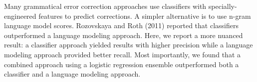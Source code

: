 Many grammatical error correction approaches use classifiers with specially-engineered features to predict corrections. A simpler alternative is to use n-gram language model scores. Rozovskaya and Roth (2011) reported that classifiers outperformed a language modeling approach.                    Here, we report a more nuanced result: a classifier approach yielded results with higher precision while a language modeling approach provided better recall. Most importantly, we found that a combined approach using a logistic regression ensemble outperformed both a classifier and a language modeling approach.
